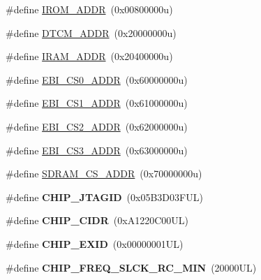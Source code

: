 \begin{DoxyCompactItemize}
\item 
\#define \mbox{\hyperlink{group__SAMV71N20__definitions_ga694212ffb8c2786bacee3d0ad6020bda}{I\+R\+O\+M\+\_\+\+A\+D\+DR}}~(0x00800000u)
\item 
\#define \mbox{\hyperlink{group__SAMV71N20__definitions_ga26626a425f7ebb3a0c2dbc276f0d9f78}{D\+T\+C\+M\+\_\+\+A\+D\+DR}}~(0x20000000u)
\item 
\#define \mbox{\hyperlink{group__SAMV71N20__definitions_gaae45ac2ef16942159481c767ac4805cf}{I\+R\+A\+M\+\_\+\+A\+D\+DR}}~(0x20400000u)
\item 
\#define \mbox{\hyperlink{group__SAMV71N20__definitions_ga9bcbb97ddae3b2cc5e2c9613d33f66b4}{E\+B\+I\+\_\+\+C\+S0\+\_\+\+A\+D\+DR}}~(0x60000000u)
\item 
\#define \mbox{\hyperlink{group__SAMV71N20__definitions_gaaddd9fdbbc77c9aced5308819f502a26}{E\+B\+I\+\_\+\+C\+S1\+\_\+\+A\+D\+DR}}~(0x61000000u)
\item 
\#define \mbox{\hyperlink{group__SAMV71N20__definitions_ga058a35f9991487dc2dd12ada792d0730}{E\+B\+I\+\_\+\+C\+S2\+\_\+\+A\+D\+DR}}~(0x62000000u)
\item 
\#define \mbox{\hyperlink{group__SAMV71N20__definitions_gad66ebdd0fc33ec3cf85dbaa14bbf05d9}{E\+B\+I\+\_\+\+C\+S3\+\_\+\+A\+D\+DR}}~(0x63000000u)
\item 
\#define \mbox{\hyperlink{group__SAMV71N20__definitions_ga61b7db25daf759c2a2beb6e5a0b57a84}{S\+D\+R\+A\+M\+\_\+\+C\+S\+\_\+\+A\+D\+DR}}~(0x70000000u)
\item 
\mbox{\label{group__SAMV71N20__definitions_gaa614519778eec0df55d3eeab3223e3f6}} 
\#define {\bfseries C\+H\+I\+P\+\_\+\+J\+T\+A\+G\+ID}~(0x05\+B3\+D03\+F\+U\+L)
\item 
\mbox{\label{group__SAMV71N20__definitions_ga1e1ae44dd9269a8a98c1d7e7a60e9fbd}} 
\#define {\bfseries C\+H\+I\+P\+\_\+\+C\+I\+DR}~(0x\+A1220\+C00\+U\+L)
\item 
\mbox{\label{group__SAMV71N20__definitions_ga35123717aa86b76bb6b73cf3adc4c2e6}} 
\#define {\bfseries C\+H\+I\+P\+\_\+\+E\+X\+ID}~(0x00000001\+U\+L)
\item 
\mbox{\label{group__SAMV71N20__definitions_ga0e868bf27426399dfdcb3a9dfc3733c4}} 
\#define {\bfseries C\+H\+I\+P\+\_\+\+F\+R\+E\+Q\+\_\+\+S\+L\+C\+K\+\_\+\+R\+C\+\_\+\+M\+IN}~(20000\+U\+L)

\end{DoxyCompactItemize}

